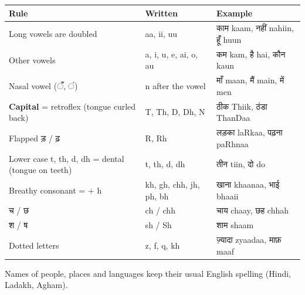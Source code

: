 \documentclass[11pt, a4paper]{article}
\newcommand{\hw}[1]{{\hindifont #1}}
\begin{document}
\begin{tabular}{@{}p{4.6cm}p{3.4cm}p{6.2cm}@{}}
  \toprule
  Rule & Written & Example \\
  \midrule
  Long vowels are doubled        & aa, ii, uu         & \hw{काम} kaam, \hw{नहीं} nahiin, \hw{हूँ} huun \\
  Other vowels                   & a, i, u, e, ai, o, au & \hw{कम} kam, \hw{है} hai, \hw{कौन} kaun \\
  Nasal vowel (\hw{ँ}, \hw{ं})    & n after the vowel  & \hw{माँ} maan, \hw{मैं} main, \hw{में} men \\
  \textbf{Capital} = retroflex (tongue curled back) & T, Th, D, Dh, N & \hw{ठीक} Thiik, \hw{ठंडा} ThanDaa \\
  Flapped \hw{ड़} / \hw{ढ़}        & R, Rh              & \hw{लड़का} laRkaa, \hw{पढ़ना} paRhnaa \\
  Lower case t, th, d, dh = dental (tongue on teeth) & t, th, d, dh & \hw{तीन} tiin, \hw{दो} do \\
  Breathy consonant = + h        & kh, gh, chh, jh, ph, bh & \hw{खाना} khaanaa, \hw{भाई} bhaaii \\
  \hw{च} / \hw{छ}                 & ch / chh           & \hw{चाय} chaay, \hw{छह} chhah \\
  \hw{श} / \hw{ष}                 & sh / Sh            & \hw{शाम} shaam \\
  Dotted letters                 & z, f, q, kh        & \hw{ज़्यादा} zyaadaa, \hw{माफ़} maaf \\
  \bottomrule
\end{tabular}

\medskip
Names of people, places and languages keep their usual English spelling (Hindi, Ladakh, Agham).
\clearpage


\clearpage

\clearpage

\clearpage

\clearpage


\end{document}
